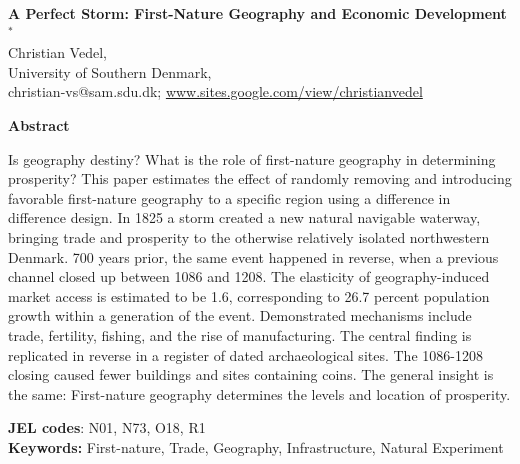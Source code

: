 \documentclass[11pt]{article}
\begin{document}
\begin{titlepage}

    \begin{center}
        \LARGE
        \textbf{A Perfect Storm: First-Nature Geography and Economic Development$^*$} \\
        
        \vspace{0.5cm}
        \large
        Christian Vedel, \\ University of Southern Denmark,\\
        \small
        \vspace{0.25cm}
        christian-vs@sam.sdu.dk; 
        \url{www.sites.google.com/view/christianvedel} 
        
        \vspace{0.75cm}
    
        \large
        \textbf{Abstract} \\     
    \end{center}

   
    \normalsize
    \begin{changemargin}{1cm}{1cm}
    Is geography destiny? What is the role of first-nature geography in determining prosperity? This paper estimates the effect of randomly removing and introducing favorable first-nature geography to a specific region using a difference in difference design. In 1825 a storm created a new natural navigable waterway, bringing trade and prosperity to the otherwise relatively isolated northwestern Denmark. 700 years prior, the same event happened in reverse, when a previous channel closed up between 1086 and 1208. The elasticity of geography-induced market access is estimated to be 1.6, corresponding to 26.7 percent population growth within a generation of the event. Demonstrated mechanisms include trade, fertility, fishing, and the rise of manufacturing. The central finding is replicated in reverse in a register of dated archaeological sites. The 1086-1208 closing caused fewer buildings and sites containing coins. The general insight is the same: First-nature geography determines the levels and location of prosperity.
    
    \vspace{0.05cm} 
    \textbf{JEL codes}: N01, N73, O18, R1 \\
    \textbf{Keywords:} First-nature, Trade, Geography, Infrastructure, Natural Experiment
    \end{changemargin}

    
    

\end{titlepage}
\end{document}
